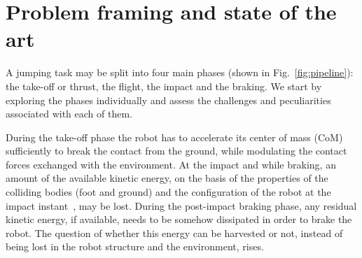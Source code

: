 \section{Problem framing and state of the art}\label{sec:prb_def}
A jumping task may be split into four main phases (shown in Fig.~\ref{fig:pipeline}): the take-off or thrust, the flight, the impact and the braking. We start by exploring the phases individually and assess the challenges and peculiarities associated with each of them.

During the take-off phase the robot has to accelerate its center of mass (CoM) sufficiently to break the contact from the ground, while modulating the contact forces exchanged with the environment.
At the impact and while braking, an amount of the available kinetic energy, on the basis of the properties of the colliding bodies (foot and ground) and the configuration of the robot at the impact instant~\cite{impact_dyn::walker1994impact},
may be lost.
During the post-impact braking phase, any residual kinetic energy, if available, needs to be somehow dissipated in order to brake the robot. The question of whether this energy can be harvested or not, instead of being lost in the robot structure and the environment, rises.
